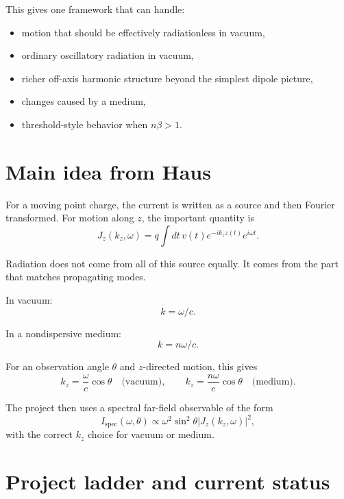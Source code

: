 \documentclass[11pt]{article}
\begin{document}
This gives one framework that can handle:
\begin{itemize}
    \item motion that should be effectively radiationless in vacuum,
    \item ordinary oscillatory radiation in vacuum,
    \item richer off-axis harmonic structure beyond the simplest dipole picture,
    \item changes caused by a medium,
    \item threshold-style behavior when $n\beta>1$.
\end{itemize}

\section{Main idea from Haus}

For a moving point charge, the current is written as a source and then Fourier transformed. For motion along $z$, the important quantity is
\[
J_z(k_z,\omega)=q\int dt\, v(t)e^{-ik_z z(t)}e^{i\omega t}.
\]

Radiation does not come from all of this source equally. It comes from the part that matches propagating modes.

In vacuum:
\[
k=\omega/c.
\]

In a nondispersive medium:
\[
k=n\omega/c.
\]

For an observation angle $\theta$ and $z$-directed motion, this gives
\[
k_z=\frac{\omega}{c}\cos\theta \quad \text{(vacuum)},
\qquad
k_z=\frac{n\omega}{c}\cos\theta \quad \text{(medium)}.
\]

The project then uses a spectral far-field observable of the form
\[
I_{\text{spec}}(\omega,\theta)\propto \omega^2 \sin^2\theta
\left|J_z(k_z,\omega)\right|^2,
\]
with the correct $k_z$ choice for vacuum or medium.

\section{Project ladder and current status}
\end{document}
